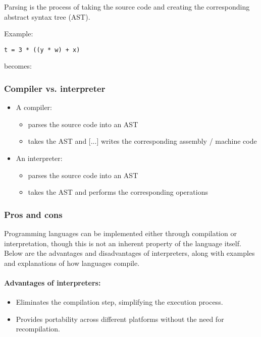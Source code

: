 \documentclass[12pt]{article}
\begin{document}
Parsing is the process of taking the source code and creating the corresponding abstract syntax tree (AST).

Example:

\begin{verbatim}
t = 3 * ((y * w) + x)
\end{verbatim}

becomes:


\subsubsection{Compiler vs. interpreter}

\begin{itemize}
  \item A compiler:
  \begin{itemize}
    \item parses the source code into an AST
    \item takes the AST and [...] writes the corresponding assembly / machine code
  \end{itemize}
  \item An interpreter:
  \begin{itemize}
    \item parses the source code into an AST
    \item takes the AST and performs the corresponding operations
  \end{itemize}
\end{itemize}

\subsubsection{Pros and cons}
Programming languages can be implemented either through compilation or interpretation, though this is not an inherent property of the language itself. Below are the advantages and disadvantages of interpreters, along with examples and explanations of how languages compile.

\paragraph{Advantages of interpreters:}
\begin{itemize}
    \item Eliminates the compilation step, simplifying the execution process.
    \item Provides portability across different platforms without the need for recompilation.
\end{itemize}
\end{document}
